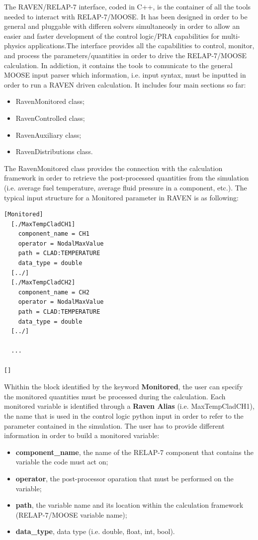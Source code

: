 \documentclass{mc2013}
\begin{document}
The RAVEN/RELAP-7 interface, coded in C++, is the container of all the tools needed to interact with RELAP-7/MOOSE. It has been designed in order to be general and pluggable with differen solvers simultaneosly in order to allow an easier and faster development of the control logic/PRA capabilities for multi-physics applications.The interface provides all the capabilities to control, monitor, and process the parameters/quantities in order to drive the RELAP-7/MOOSE calculation. In addiction, it contains the tools to comunicate to the general MOOSE input parser which information, i.e. input syntax, must be inputted in order to run a RAVEN driven calculation. It includes four main sections so far:
\begin{itemize}
\item RavenMonitored class;
\item RavenControlled class;
\item RavenAuxiliary class;
\item RavenDistributions class.
\end{itemize}
The RavenMonitored class provides the connection with the calculation framework in order to retrieve the post-processed quantities from the simulation (i.e. average fuel temperature, average fluid pressure in a component, etc.). The typical input structure for a Monitored parameter in RAVEN is as following:
\begin{lstlisting}
[Monitored]
  [./MaxTempCladCH1]
    component_name = CH1
    operator = NodalMaxValue
    path = CLAD:TEMPERATURE
    data_type = double
  [../]
  [./MaxTempCladCH2]
    component_name = CH2
    operator = NodalMaxValue
    path = CLAD:TEMPERATURE
    data_type = double
  [../]

  ...

[]
\end{lstlisting}
Whithin the block identified by the keyword \textbf{Monitored}, the user can specify the monitored quantities must be processed during the calculation. Each monitored variable is identified through a \textbf{Raven Alias} (i.e. MaxTempCladCH1), the name that is used in the control logic python input in order to refer to the parameter contained in the simulation.
The user has to provide different information in order to build a monitored variable:
\begin{itemize}
  \item \textbf{component\_name}, the name of the RELAP-7 component that contains the variable the code must act on;
  \item \textbf{operator}, the post-processor oparation that must be performed on the variable;
  \item \textbf{path}, the variable name and its location within the calculation framework (RELAP-7/MOOSE variable name);
  \item \textbf{data\_type}, data type (i.e. double, float, int, bool).
\end{itemize}
\end{document}
